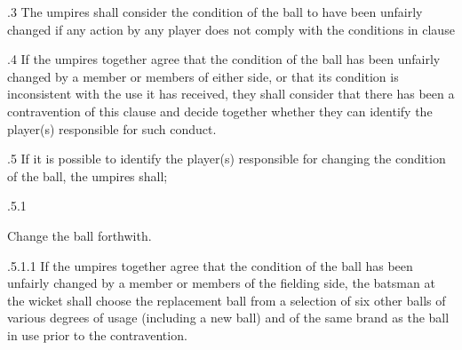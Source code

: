\documentclass[12pt]{article}
\begin{document}
\vspace{\baselineskip}
\begin{adjustwidth}{0.5in}{0.38in}
{\fontsize{9pt}{10.8pt}.3 \tabto{0.49in} The umpires shall consider the condition of the ball to have been unfairly changed if any action by any player does not comply with the conditions in clause \par}\par

\end{adjustwidth}


\vspace{\baselineskip}
\begin{adjustwidth}{0.5in}{0.14in}
{\fontsize{9pt}{10.8pt}.4 \tabto{0.49in} If the umpires together agree that the condition of the ball has been unfairly changed by a member or members of either side, or that its condition is inconsistent with the use it has received, they shall consider that there has been a contravention of this clause and decide together whether they can identify the player(s) responsible for such conduct.\par}\par

\end{adjustwidth}


\vspace{\baselineskip}
{\fontsize{9pt}{10.8pt}.5 \tabto{0.49in} If it is possible to identify the player(s) responsible for changing the condition of the ball, the umpires shall;\par}\par


\vspace{\baselineskip}
\begin{adjustwidth}{0.49in}{0.0in}
{\fontsize{9pt}{10.8pt}.5.1 \tabto{1.17in} {\fontsize{8pt}{9.6pt}\selectfont Change the ball forthwith.\par}\par}\par

\end{adjustwidth}


\vspace{\baselineskip}
\begin{adjustwidth}{2.0in}{0.03in}
{\fontsize{9pt}{10.8pt}.5.1.1 \tabto{1.99in} If the umpires together agree that the condition of the ball has been unfairly changed by a member or members of the fielding side, the batsman at the wicket shall choose the replacement ball from a selection of six other balls of various degrees of usage (including a new ball) and of the same brand as the ball in use prior to the contravention.\par}\par

\end{adjustwidth}
\end{document}
